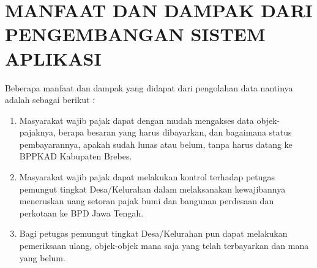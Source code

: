 \documentclass[pdftex,12pt, oneside]{article}
\begin{document}
\section{MANFAAT DAN DAMPAK DARI PENGEMBANGAN SISTEM APLIKASI}

Beberapa manfaat dan dampak yang didapat dari pengolahan data nantinya adalah sebagai berikut :

\begin{enumerate}
	\item Masyarakat wajib pajak dapat dengan mudah mengakses data objek-pajaknya, berapa besaran yang harus dibayarkan, dan bagaimana status pembayarannya, apakah sudah lunas atau belum, tanpa harus datang ke BPPKAD Kabupaten Brebes.
	
	\item Masyarakat wajib pajak dapat melakukan kontrol terhadap petugas pemungut tingkat Desa/Kelurahan dalam melaksanakan kewajibannya meneruskan uang setoran pajak bumi dan bangunan perdesaan dan perkotaan ke BPD Jawa Tengah.
	
	\item Bagi petugas pemungut tingkat Desa/Kelurahan pun dapat melakukan pemeriksaan ulang, objek-objek mana saja yang telah terbayarkan dan mana yang belum.
\end{enumerate}
\end{document}
